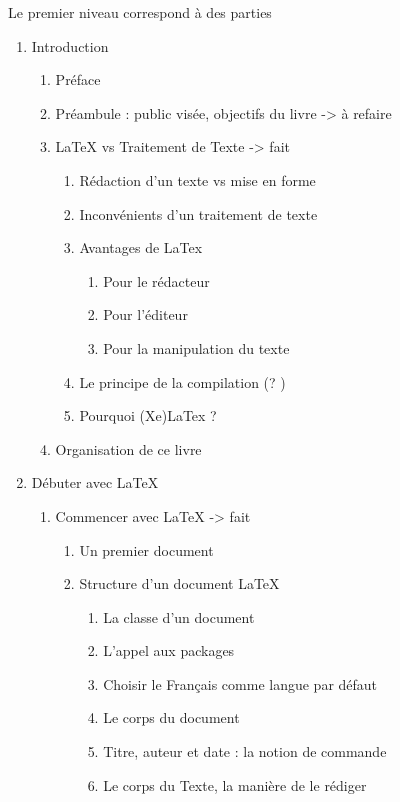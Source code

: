 Le premier niveau correspond à des parties
\begin{enumerate}
\item Introduction
	
	\begin{enumerate}
	\item Préface
	\item Préambule : public visée, objectifs du livre			-> à refaire
	\item LaTeX vs Traitement de Texte					-> fait
		\begin{enumerate}
		\item Rédaction d'un texte vs mise en forme
		\item Inconvénients d'un traitement de texte
		\item Avantages de LaTex
		\begin{enumerate}
			\item Pour le rédacteur
			\item Pour l'éditeur
			\item Pour la manipulation du texte
		\end{enumerate}
		\item Le principe de la compilation  (? )
		\item Pourquoi (Xe)LaTex ?
		\end{enumerate}
	\item Organisation de ce livre
	\end{enumerate}
\item Débuter avec LaTeX
\begin{enumerate}
	\item Commencer avec LaTeX						-> fait
	\begin{enumerate}
		\item Un premier document
		\item Structure d'un document LaTeX
		\begin{enumerate}
			\item La classe d'un document
			\item L'appel aux packages
			\item Choisir le Français comme langue par défaut
			\item Le corps du document
			\item Titre, auteur et date : la notion de commande
			\item Le corps du Texte, la manière de le rédiger

\end{enumerate}
\end{enumerate}
\end{enumerate}
\end{enumerate}
